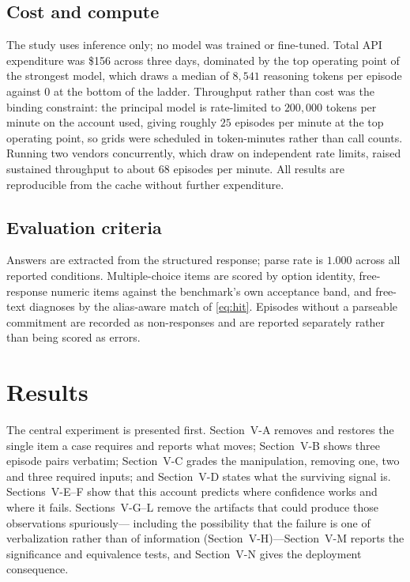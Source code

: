 \documentclass[journal,twoside]{IEEEtran}
\begin{document}
\subsection{Cost and compute}
The study uses inference only; no model was trained or fine-tuned. Total API expenditure was
\$156 across three days, dominated by the top operating point of the strongest model, which draws a
median of $8{,}541$ reasoning tokens per episode against $0$ at the bottom of the ladder. Throughput
rather than cost was the binding constraint: the principal model is rate-limited to $200{,}000$
tokens per minute on the account used, giving roughly $25$ episodes per minute at the top operating
point, so grids were scheduled in token-minutes rather than call counts. Running two vendors
concurrently, which draw on independent rate limits, raised sustained throughput to about $68$
episodes per minute. All results are reproducible from the cache without further expenditure.

\subsection{Evaluation criteria}
Answers are extracted from the structured response; parse rate is $1.000$ across all reported
conditions. Multiple-choice items are scored by option identity, free-response numeric items against
the benchmark's own acceptance band, and free-text diagnoses by the alias-aware match of
\eqref{eq:hit}. Episodes without a parseable commitment are recorded as non-responses and are
reported separately rather than being scored as errors.

\section{Results}

The central experiment is presented first. Section~V-A removes and restores the single item a case
requires and reports what moves; Section~V-B shows three episode pairs verbatim; Section~V-C grades
the manipulation, removing one, two and three required inputs; and Section~V-D states what the
surviving signal is. Sections~V-E--F show that this account predicts where confidence works and where
it fails. Sections~V-G--L remove the artifacts that could produce those observations spuriously---
including the possibility that the failure is one of verbalization rather than of information
(Section~V-H)---Section~V-M reports the significance and equivalence tests, and Section~V-N gives the
deployment consequence.
\end{document}
